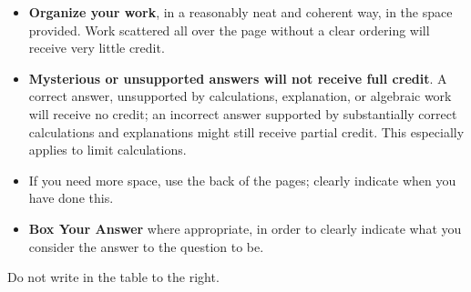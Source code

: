 \documentclass[11pt]{exam}
\theoremstyle{definition}
\begin{document}
\begin{minipage}[t]{3.7in}
\vspace{0pt}
\begin{itemize}


\item \textbf{Organize your work}, in a reasonably neat and coherent way, in
the space provided. Work scattered all over the page without a clear ordering will 
receive very little credit.  

\item \textbf{Mysterious or unsupported answers will not receive full
credit}.  A correct answer, unsupported by calculations, explanation,
or algebraic work will receive no credit; an incorrect answer supported
by substantially correct calculations and explanations might still receive
partial credit.  This especially applies to limit calculations.

\item If you need more space, use the back of the pages; clearly indicate when you have done this.

\item \textbf{Box Your Answer} where appropriate, in order to clearly indicate what you consider the answer to the question to be.
\end{itemize}

Do not write in the table to the right.
\end{minipage}
\hfill
\begin{minipage}[t]{2.3in}
\vspace{0pt}
\addpoints %
\gradetable[v]%

\end{minipage}
\newpage %

%
%

\end{document}
